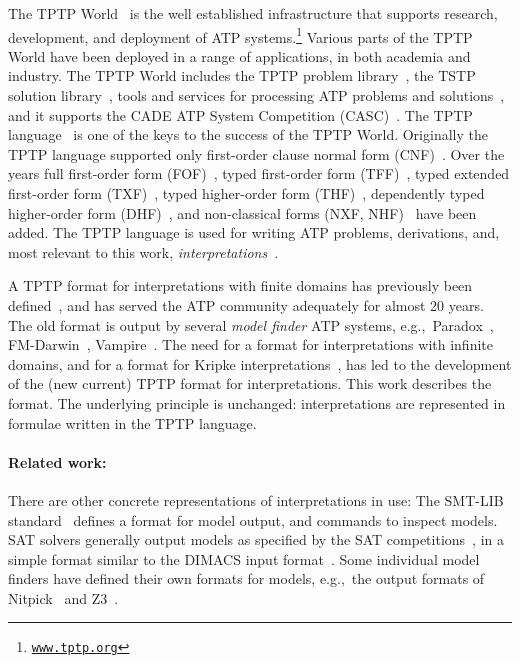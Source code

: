 \documentclass{ceurart}
\begin{document}
The TPTP World~\cite{Sut17,Sut24} is the well established infrastructure that supports research, 
development, and deployment of 
ATP systems.\footnote{%
\href{https://www.tptp.org}{\tt www.tptp.org}}
Various parts of the TPTP World have been deployed in a range of applications, in both academia 
and industry.
The TPTP World includes the TPTP problem library~\cite{Sut09}, 
the TSTP solution library~\cite{Sut10}, 
tools and services for processing ATP problems and solutions~\cite{Sut10}, 
and it supports the CADE ATP System Competition (CASC)~\cite{Sut16}.
The TPTP language~\cite{Sut23-IGPL} is one of the keys to the success of the TPTP World.
Originally the TPTP language supported only first-order clause normal form (CNF)~\cite{SS98-JAR}.
Over the years full first-order form (FOF)~\cite{Sut09}, 
typed first-order form (TFF)~\cite{SS+12,BP13-TFF1}, 
typed extended first-order form (TXF)~\cite{SK18}, 
typed higher-order form (THF)~\cite{SB10,KSR16}, 
dependently typed higher-order form (DHF)~\cite{RK+25},
and non-classical forms (NXF, NHF)~\cite{SF+22}
have been added.
The TPTP language is used for writing ATP problems, derivations, and, most relevant to this 
work, \emph{interpretations}~\cite{SS+06,Sut08-KEAPPA}.

A TPTP format for interpretations with finite domains has previously been defined~\cite{SS+06},
and has served the ATP community adequately for almost 20 years. 
The old format is output by several \emph{model finder} ATP systems, e.g.,~Paradox~\cite{CS03}, 
FM-Darwin~\cite{BF+06}, Vampire~\cite{KV13}.
The need for a format for interpretations with infinite domains, and for a format for Kripke 
interpretations~\cite{Kri63}, has led to the development of the (new current) TPTP format for 
interpretations.
This work describes the format.
The underlying principle is unchanged: interpretations are represented in formulae written in
the TPTP language.

\paragraph{Related work:}
There are other concrete representations of interpretations in use:
The SMT-LIB standard~\cite{BFT17} defines a format for model output, and commands to inspect 
models.  
SAT solvers generally output models as specified by the SAT competitions~\cite{JL+12}, in a 
simple format similar to the DIMACS input format~\cite{Bab93}.
Some individual model finders have defined their own formats for models, e.g.,~the 
output formats of Nitpick~\cite{BN10-ITP} and Z3~\cite{dMB08}.
\end{document}
